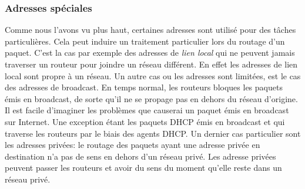\subsubsection{Adresses spéciales}

Comme nous l'avons vu plus haut, certaines adresses sont utilisé pour des
tâches particulières. Cela peut induire un traitement particulier lors du routage
d'un paquet.  C'est la cas par exemple des adresses de {\it lien local} qui ne
peuvent jamais traverser un routeur pour joindre un réseau différent. En effet
les adresses de lien local sont propre à un réseau.
Un autre cas ou les adresses sont limitées, est le cas des adresses de broadcast.
En temps normal, les routeurs bloques les paquets émis en broadcast, de sorte qu'il ne se propage pas en dehors du réseau d'origine. Il est facile d'imaginer les problèmes que causerai un paquet émis en broadcast sur Internet. Une exception étant les paquets DHCP émis en broadcast et qui traverse les routeurs par le biais des agents DHCP.
Un dernier cas particulier sont les adresses privées: le routage des paquets ayant une adresse privée en destination n'a pas de sens en dehors d'un réseau privé. Les adresse privées peuvent passer les routeurs et avoir du sens du moment qu'elle reste dans un réseau privé.

